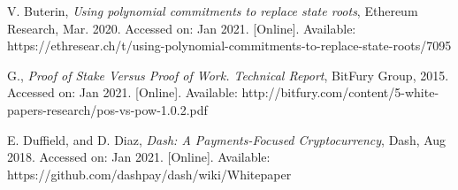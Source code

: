 \documentclass[peerreview]{ieeesyscoin}
\begin{document}
\begin{thebibliography}{00}
 V. Buterin, \textit{Using polynomial commitments to replace state roots}, Ethereum Research, Mar. 2020. Accessed on: Jan 2021. [Online]. Available: https://ethresear.ch/t/using-polynomial-commitments-to-replace-state-roots/7095

 G., \textit{Proof of Stake Versus Proof of Work. Technical Report}, BitFury Group, 2015. Accessed on: Jan 2021. [Online]. Available: http://bitfury.com/content/5-white-papers-research/pos-vs-pow-1.0.2.pdf 


 E. Duffield, and D. Diaz, \textit{Dash: A Payments-Focused Cryptocurrency}, Dash, Aug 2018. Accessed on: Jan 2021. [Online]. Available: https://github.com/dashpay/dash/wiki/Whitepaper




\end{thebibliography}


\EOD
\end{document}
